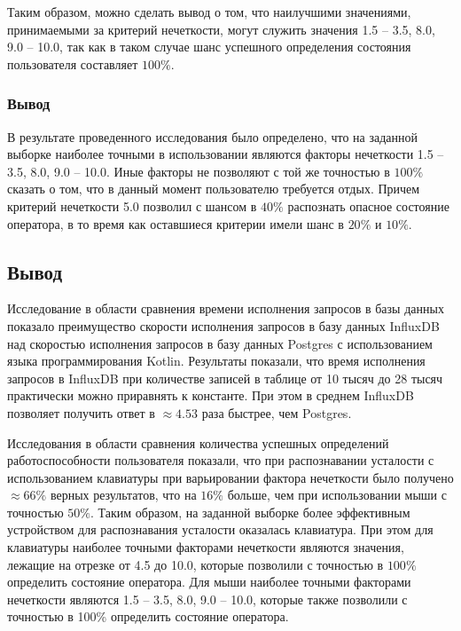 Таким образом, можно сделать вывод о том, что наилучшими значениями, принимаемыми за критерий нечеткости, могут служить значения 1.5 -- 3.5, 8.0, 9.0 -- 10.0, так как в таком случае шанс успешного определения состояния пользователя составляет $100\%$.

\subsubsection*{Вывод}
В результате проведенного исследования было определено, что на заданной выборке наиболее точными в использовании являются факторы нечеткости 1.5 -- 3.5, 8.0, 9.0 -- 10.0. Иные факторы не позволяют с той же точностью в $100\%$ сказать о том, что в данный момент пользователю требуется отдых. Причем критерий нечеткости 5.0 позволил с шансом в $40\%$ распознать опасное состояние оператора, в то время как оставшиеся критерии имели шанс в $20\%$ и $10\%$.

\subsection*{Вывод}
Исследование в области сравнения времени исполнения запросов в базы данных показало преимущество скорости исполнения запросов в базу данных InfluxDB над скоростью исполнения запросов в базу данных Postgres с использованием языка программирования Kotlin. Результаты показали, что время исполнения запросов в InfluxDB при количестве записей в таблице от 10 тысяч до 28 тысяч практически можно приравнять к константе. При этом в среднем InfluxDB позволяет получить ответ в $\approx 4.53$ раза быстрее, чем Postgres.

Исследования в области сравнения количества успешных определений работоспособности пользователя показали, что при распознавании усталости с использованием клавиатуры при варьировании фактора нечеткости было получено $\approx 66\%$ верных результатов, что на $16\%$ больше, чем при использовании мыши с точностью $50\%$. Таким образом, на заданной выборке более эффективным устройством для распознавания усталости оказалась клавиатура. При этом для клавиатуры наиболее точными факторами нечеткости являются значения, лежащие на отрезке от 4.5 до 10.0, которые позволили с точностью в $100\%$ определить состояние оператора. Для мыши наиболее точными факторами нечеткости являются 1.5 -- 3.5, 8.0, 9.0 -- 10.0, которые также позволили с точностью в 100\% определить состояние оператора.

\pagebreak